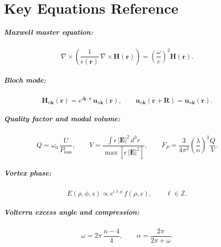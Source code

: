 \documentclass[12pt,a4paper,oneside]{book}
\theoremstyle{plain}
\theoremstyle{definition}
\theoremstyle{remark}
\newcommand{\vb}[1]{\bm{#1}}
\newcommand{\Hfield}{\vb{H}}
\newcommand{\Efield}{\vb{E}}
\newcommand{\eps}{\epsilon}
\newcommand{\om}{\omega}
\newcommand{\kvec}{\vb{k}}
\newcommand{\rvec}{\vb{r}}
\newcommand{\Rvec}{\vb{R}}
\begin{document}
\chapter{Key Equations Reference}
\label{app:equations}

\paragraph{Maxwell master equation:}
\begin{equation}
  \nabla \times \left(\frac{1}{\eps(\rvec)}\,\nabla \times \Hfield(\rvec)\right)
  = \left(\frac{\om}{c}\right)^2 \Hfield(\rvec).
\end{equation}

\paragraph{Bloch mode:}
\begin{equation}
  \Hfield_{n\kvec}(\rvec) = e^{i\kvec\cdot\rvec}\,\vb{u}_{n\kvec}(\rvec), \qquad \vb{u}_{n\kvec}(\rvec+\Rvec)=\vb{u}_{n\kvec}(\rvec).
\end{equation}

\paragraph{Quality factor and modal volume:}
\begin{equation}
  Q = \om_0\,\frac{U}{P_\mathrm{loss}}, \qquad
  V = \frac{\int \eps\,|\Efield|^2\,d^3r}{\max[\eps\,|\Efield|^2]}, \qquad
  F_P = \frac{3}{4\pi^2}\left(\frac{\lambda}{n}\right)^3\frac{Q}{V}.
\end{equation}

\paragraph{Vortex phase:}
\begin{equation}
  E(\rho,\phi,z) \propto e^{i\ell\phi}\,f(\rho,z), \qquad \ell \in \mathbb{Z}.
\end{equation}

\paragraph{Volterra excess angle and compression:}
\begin{equation}
  \omega = 2\pi\,\frac{n-4}{4}, \qquad \alpha = \frac{2\pi}{2\pi+\omega}.
\end{equation}
\end{document}
